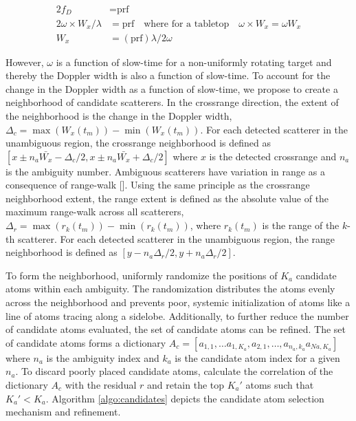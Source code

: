 \begin{equation}
  \begin{aligned}
    2 f_{D} &= \text{prf} \\
    2 \omega \times W_{x} / \lambda &= \text{prf} \quad \textrm{where for a tabletop} \quad \omega \times W_{x} = \omega W_{x} \\ 
    W_{x} &= (\text{prf}) \lambda / 2 \omega
  \end{aligned}
\end{equation}

\noindent However, $\omega$ is a function of slow-time for a non-uniformly rotating target and thereby the Doppler width is also a function of slow-time. To account for the change in the Doppler width as a function of slow-time, we propose to create a neighborhood of candidate scatterers. In the crossrange direction, the extent of the neighborhood is the change in the Doppler width, $\Delta_{c} = \max(W_{x}(t_{m})) - \min(W_{x}(t_{m}))$. For each detected scatterer in the unambiguous region, the crossrange neighborhood is defined as $[x \pm n_{a}\bar{W_x} - \Delta_{c}/2, x \pm n_{a}\bar{W_x} + \Delta_{c}/2]$ where $x$ is the detected crossrange and $n_{a}$ is the ambiguity number. Ambiguous scatterers have variation in range as a consequence of range-walk []. Using the same principle as the crossrange neighborhood extent, the range extent is defined as the absolute value of the maximum range-walk across all scatterers, $\Delta_{r} = \max(r_{k}(t_{m})) - \min(r_{k}(t_{m}))$, where $r_{k}(t_{m})$ is the range of the $k$-th scatterer. For each detected scatterer in the unambiguous region, the range neighborhood is defined as $[y - n_{a}\Delta_{r}/2, y + n_{a}\Delta_{r}/2]$. 


To form the neighborhood, uniformly randomize the positions of $K_a$ candidate atoms within each ambiguity. The randomization distributes the atoms evenly across the neighborhood and prevents poor, systemic initialization of atoms like a line of atoms tracing along a sidelobe. Additionally, to further reduce the number of candidate atoms evaluated, the set of candidate atoms can be refined. The set of candidate atoms forms a dictionary $A_{c} = [a_{1,1}, \dots a_{1,K_{a}}, a_{2, 1}, \dots, a_{n_{a}, k_{a}} a_{Na, K_{a}}]$ where $n_{a}$ is the ambiguity index and $k_{a}$ is the candidate atom index for a given $n_{a}$. To discard poorly placed candidate atoms, calculate the correlation of the dictionary $A_{c}$ with the residual $r$ and retain the top $K_{a}'$ atoms such that $K_{a}' < K_{a}$. Algorithm \ref{algo:candidates} depicts the candidate atom selection mechanism and refinement. 


